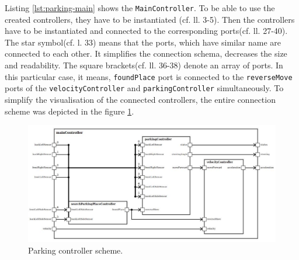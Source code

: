 \bigskip
Listing \ref{lst:parking-main} shows the \texttt{MainController}. To be able to use the created controllers, they have to be instantiated (cf. ll. 3-5). Then the controllers have to be instantiated and connected to the corresponding ports(cf. ll. 27-40). The star symbol(cf. l. 33) means that the ports, which have similar name are connected to each other. It simplifies the connection schema, decreases the size and readability. The square brackets(cf. ll. 36-38) denote an array of ports. In this particular case, it means, \texttt{foundPlace} port is connected to the \texttt{reverseMove} ports of the \texttt{velocityController} and \texttt{parkingController} simultaneously. To simplify the visualisation of the connected controllers, the entire connection scheme was depicted in the figure \ref{fig:parking-scheme}.
\begin{figure}[h!]
    \centering
    \includegraphics[width=\linewidth]{src/pic/parking-scheme}
    \caption{Parking controller scheme.}
    \label{fig:parking-scheme}
\end{figure}

